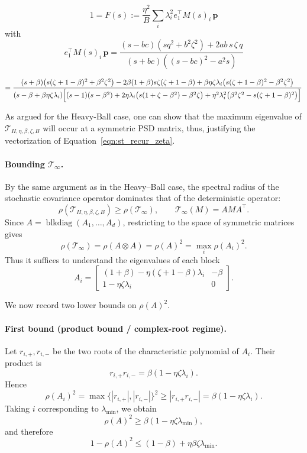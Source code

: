 \documentclass{article}
\newcommand{\T}{\mathcal{T}}
\begin{document}
\begin{equation}
\label{eqn:sec_eq_asgd}
1 = F(s) := \frac{\eta^2}{B} \sum_i \lambda_i^2 e_1^{\top} M(s)_i\, \textbf{p}
\end{equation}
with 
\[
e_1^{\top} M(s)_i\, \textbf{p}
=
\frac{(s-bc)\left(s q^{2} + b^{2}\zeta^{2}\right)
      + 2ab\, s\, \zeta\, q}
     {(s+bc)\left((s-bc)^{2} - a^{2}s\right)}
\]

\[
=\frac{
(s + \beta)\bigl(s(\zeta + 1 - \beta)^2 + \beta^2 \zeta^2\bigr)
- 2\beta(1 + \beta)s\zeta(\zeta + 1 - \beta)
+ \beta \eta \zeta \lambda_i \bigl(s(\zeta + 1 - \beta)^2 - \beta^2 \zeta^2\bigr)
}{
(s - \beta + \beta \eta \zeta \lambda_i)
\Bigl[
(s - 1)(s - \beta^2)
+ 2\eta \lambda_i \bigl(s(1 + \zeta - \beta^2) - \beta^2 \zeta\bigr)
+ \eta^2 \lambda_i^2 \bigl(\beta^2 \zeta^2 - s(\zeta + 1 - \beta)^2\bigr)
\Bigr]
}
\]

As argued for the Heavy-Ball case, one can show that the maximum eigenvalue of $\mathcal{T}_{H,\eta,\beta,\zeta,B}$ will occur at a symmetric PSD matrix, thus, justifying the vectorization of Equation~\ref{eqn:st_recur_zeta}.

\paragraph{Bounding $\T_\infty$.}
By the same argument as in the Heavy--Ball case, the spectral radius of the
stochastic covariance operator dominates that of the deterministic operator:
\[
\rho(\mathcal{T}_{H,\eta,\beta,\zeta,B})\ge \rho(\T_\infty),
\qquad
\T_\infty(M)=AMA^\top.
\]
Since \(A=\operatorname{blkdiag}(A_1,\dots,A_d)\), restricting to the space of
symmetric matrices gives
\[
\rho(\T_\infty)=\rho(A\otimes A)=\rho(A)^2=\max_i \rho(A_i)^2.
\]
Thus it suffices to understand the eigenvalues of each block
\[
A_i=
\begin{bmatrix}
(1+\beta)-\eta(\zeta+1-\beta)\lambda_i & -\beta\\[2pt]
1-\eta\zeta\lambda_i & 0
\end{bmatrix}.
\]

We now record two lower bounds on \(\rho(A)^2\).

\paragraph{First bound (product bound / complex-root regime).}
Let \(r_{i,+},r_{i,-}\) be the two roots of the characteristic polynomial of
\(A_i\). Their product is
\[
r_{i,+}r_{i,-}=\beta(1-\eta\zeta\lambda_i).
\]
Hence
\[
\rho(A_i)^2
=
\max\{|r_{i,+}|,|r_{i,-}|\}^2
\ge |r_{i,+}r_{i,-}|
=
\beta(1-\eta\zeta\lambda_i).
\]
Taking \(i\) corresponding to \(\lambda_{\min}\), we obtain
\[
\rho(A)^2\ge \beta(1-\eta\zeta\lambda_{\min}),
\]
and therefore
\begin{equation}
\label{eq:asgd-det-prod-hbstyle}
1-\rho(A)^2
\le
(1-\beta)+\eta\beta\zeta\lambda_{\min}.
\end{equation}
\end{document}
